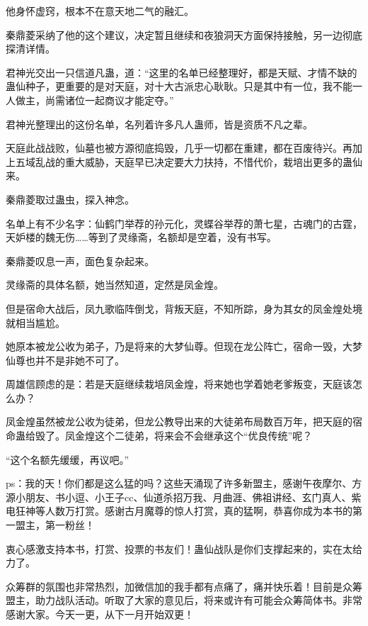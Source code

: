 \begin{this_body}
他身怀虚窍，根本不在意天地二气的融汇。

秦鼎菱采纳了他的这个建议，决定暂且继续和夜狼洞天方面保持接触，另一边彻底探清详情。

君神光交出一只信道凡蛊，道：“这里的名单已经整理好，都是天赋、才情不缺的蛊仙种子，更重要的是对天庭，对十大古派忠心耿耿。只是其中有一位，我不能一人做主，尚需诸位一起商议才能定夺。”

君神光整理出的这份名单，名列着许多凡人蛊师，皆是资质不凡之辈。

天庭此战战败，仙墓也被方源彻底捣毁，几乎一切都在重建，都在百废待兴。再加上五域乱战的重大威胁，天庭早已决定要大力扶持，不惜代价，栽培出更多的蛊仙来。

秦鼎菱取过蛊虫，探入神念。

名单上有不少名字：仙鹤门举荐的孙元化，灵蝶谷举荐的萧七星，古魂门的古霆，天妒楼的魏无伤……等到了灵缘斋，名额却是空着，没有书写。

秦鼎菱叹息一声，面色复杂起来。

灵缘斋的具体名额，她当然知道，定然是凤金煌。

但是宿命大战后，凤九歌临阵倒戈，背叛天庭，不知所踪，身为其女的凤金煌处境就相当尴尬。

她原本被龙公收为弟子，乃是将来的大梦仙尊。但现在龙公阵亡，宿命一毁，大梦仙尊也并不是非她不可了。

周雄信顾虑的是：若是天庭继续栽培凤金煌，将来她也学着她老爹叛变，天庭该怎么办？

凤金煌虽然被龙公收为徒弟，但龙公教导出来的大徒弟布局数百万年，把天庭的宿命蛊给毁了。凤金煌这个二徒弟，将来会不会继承这个“优良传统”呢？

“这个名额先缓缓，再议吧。”

ps：我的天！你们都是这么猛的吗？这些天涌现了许多新盟主，感谢午夜摩尔、方源小朋友、书小逗、小王子cc、仙道杀招万我、月曲涯、佛祖讲经、玄门真人、紫电狂神等人数万打赏。感谢古月魔尊的惊人打赏，真的猛啊，恭喜你成为本书的第一盟主，第一粉丝！

衷心感激支持本书，打赏、投票的书友们！蛊仙战队是你们支撑起来的，实在太给力了。

众筹群的氛围也非常热烈，加微信加的我手都有点痛了，痛并快乐着！目前是众筹盟主，助力战队活动。听取了大家的意见后，将来或许有可能会众筹简体书。非常感谢大家。今天一更，从下一月开始双更！

\end{this_body}

